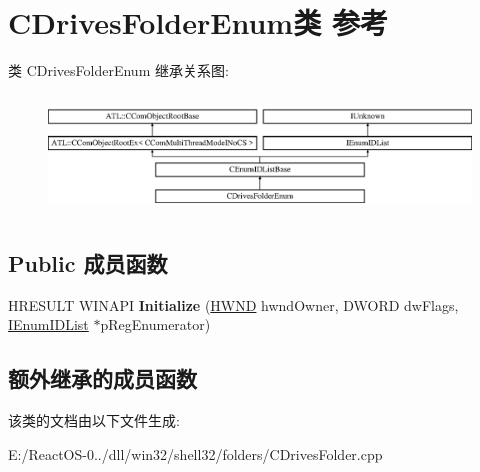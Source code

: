 \hypertarget{class_c_drives_folder_enum}{}\section{C\+Drives\+Folder\+Enum类 参考}
\label{class_c_drives_folder_enum}
类 C\+Drives\+Folder\+Enum 继承关系图\+:\begin{figure}[H]
\begin{center}
\leavevmode
\includegraphics[height=3.181818cm]{class_c_drives_folder_enum}
\end{center}
\end{figure}
\subsection*{Public 成员函数}
\begin{DoxyCompactItemize}
\item 
\mbox{\label{class_c_drives_folder_enum_aec02487290c701f8041f873a89c0fe37}} 
H\+R\+E\+S\+U\+LT W\+I\+N\+A\+PI {\bfseries Initialize} (\hyperlink{interfacevoid}{H\+W\+ND} hwnd\+Owner, D\+W\+O\+RD dw\+Flags, \hyperlink{interface_i_enum_i_d_list}{I\+Enum\+I\+D\+List} $\ast$p\+Reg\+Enumerator)
\end{DoxyCompactItemize}
\subsection*{额外继承的成员函数}


该类的文档由以下文件生成\+:\begin{DoxyCompactItemize}
\item 
E\+:/\+React\+O\+S-\/0../dll/win32/shell32/folders/C\+Drives\+Folder.\+cpp\end{DoxyCompactItemize}
